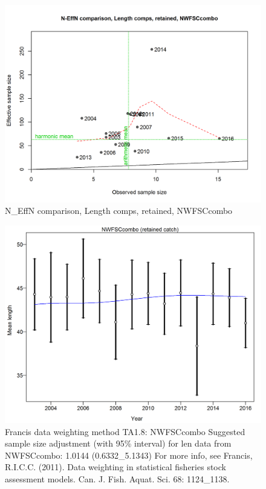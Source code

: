 \documentclass[12pt,]{article}
\begin{document}
\begin{figure}[htbp]
\centering
\includegraphics{./r4ss/plots_mod1/comp_lenfit_sampsize_flt6mkt2.png}
\caption{N\_EffN comparison, Length comps, retained, NWFSCcombo
\label{fig:mod1_28_comp_lenfit_sampsize_flt6mkt2}}
\end{figure}

\begin{figure}[htbp]
\centering
\includegraphics{./r4ss/plots_mod1/comp_lenfit_data_weighting_TA1.8_NWFSCcombo.png}
\caption{Francis data weighting method TA1.8: NWFSCcombo Suggested
sample size adjustment (with 95\% interval) for len data from
NWFSCcombo: 1.0144 (0.6332\_5.1343) For more info, see Francis, R.I.C.C.
(2011). Data weighting in statistical fisheries stock assessment models.
Can. J. Fish. Aquat. Sci. 68: 1124\_1138.
\label{fig:mod1_29_comp_lenfit_data_weighting_TA1.8_NWFSCcombo}}
\end{figure}
\end{document}

